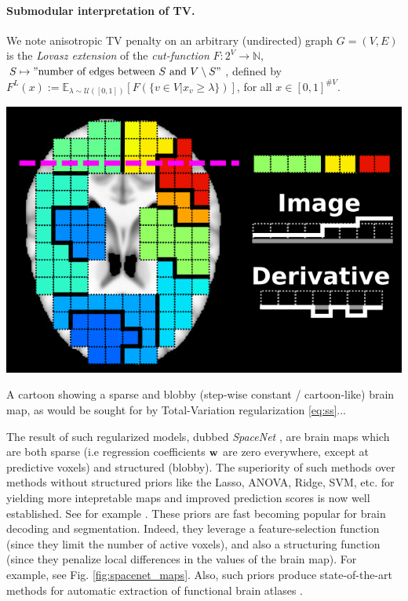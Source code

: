 \begin{mdframed}
  \paragraph{Submodular interpretation of TV.} We note anisotropic TV penalty on
  an arbitrary (undirected) graph $G = (V,E)$ is the \textit{Lovasz extension} of the \textit{cut-function}
  $F : 2^V \rightarrow \mathbb N$, $S \mapsto "\text{number of edges between } S \text{ and }V\setminus S"$,
defined by $F^L(x) := \mathbb E_{\lambda \sim \mathcal U([0,1])}[F(\{v \in V|x_v \ge \lambda\})]$, for all $x \in [0,1]^{\#V}$.
\end{mdframed}
\begin{marginfigure}[4cm]
  \includegraphics[width=1\linewidth]{figures/tv_cartoon_horizontal.png}
  \caption{A cartoon showing a sparse and blobby (step-wise constant / cartoon-like) brain map,
  as would be sought for by Total-Variation regularization \eqref{eq:ss}...}
  \label{fig:roi}
\end{marginfigure}

The result of such regularized models, dubbed \emph{SpaceNet}
  \citep{spacenetohbm}, are brain maps which are both
sparse (i.e regression coefficients $\mathbf{w}$ are zero everywhere, except at
predictive voxels) and structured (blobby). The superiority of such
methods over methods without structured priors like the Lasso, ANOVA,
Ridge, SVM, etc. for yielding more intepretable maps and improved
prediction scores is now well established. See for example
  \citep{baldassarre2012,gramfort2013}. These priors are fast becoming
popular for brain decoding and segmentation. Indeed, they leverage a
feature-selection function
(since they limit the number of active voxels),
and also a structuring function
(since they penalize local
differences in the values of the brain map). For example, see Fig.
\ref{fig:spacenet_maps}.
Also, such priors produce state-of-the-art methods for automatic
extraction of functional brain atlases   \citep{abraham2013}.

